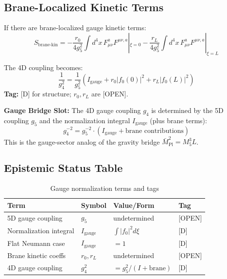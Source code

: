 \documentclass[11pt,a4paper]{article}
\begin{document}
\subsection{Brane-Localized Kinetic Terms}

If there are brane-localized gauge kinetic terms:
\begin{equation}
  S_{\text{brane-kin}} = -\frac{r_0}{4g_5^2} \int d^4x \, F_{\mu\nu}^a F^{\mu\nu,a}|_{\xi=0}
    - \frac{r_L}{4g_5^2} \int d^4x \, F_{\mu\nu}^a F^{\mu\nu,a}|_{\xi=L}
  \label{eq:brane-kinetic}
\end{equation}

The 4D coupling becomes:
\begin{equation}
  \boxed{\frac{1}{g_4^2} = \frac{1}{g_5^2} \left( I_{\text{gauge}} + r_0 |f_0(0)|^2 + r_L |f_0(L)|^2 \right)}
  \label{eq:gauge-bridge-full}
\end{equation}
\textbf{Tag:} [D] for structure; $r_0, r_L$ are [OPEN].

\begin{bridgebox}
\textbf{Gauge Bridge Slot:} The 4D gauge coupling $g_4$ is determined by the 5D
coupling $g_5$ and the normalization integral $I_{\text{gauge}}$ (plus brane terms):
\begin{equation}
  g_4^{-2} = g_5^{-2} \cdot (I_{\text{gauge}} + \text{brane contributions})
  \label{eq:gauge-bridge-slot}
\end{equation}
This is the gauge-sector analog of the gravity bridge $\bar{M}_{\text{Pl}}^2 = M_5^3 L$.
\end{bridgebox}

\subsection{Epistemic Status Table}

\begin{table}[h]
\centering
\caption{Gauge normalization terms and tags}
\label{tab:gauge-terms}
\begin{tabular}{llll}
\toprule
Term & Symbol & Value/Form & Tag \\
\midrule
5D gauge coupling & $g_5$ & undetermined & [OPEN] \\
Normalization integral & $I_{\text{gauge}}$ & $\int |f_0|^2 d\xi$ & [D] \\
Flat Neumann case & $I_{\text{gauge}}$ & $= 1$ & [D] \\
Brane kinetic coeffs & $r_0, r_L$ & undetermined & [OPEN] \\
4D gauge coupling & $g_4^2$ & $= g_5^2 / (I + \text{brane})$ & [D] \\
\bottomrule
\end{tabular}
\end{table}
\end{document}

